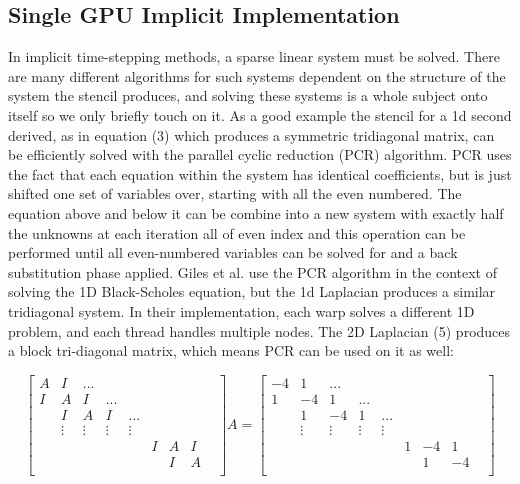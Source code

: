\documentclass[conference]{IEEEtran}
\begin{document}
\subsection{Single GPU Implicit Implementation}

In implicit time-stepping methods, a sparse linear system must be solved. There are many different algorithms for such systems dependent on the structure of the system the stencil produces, and solving these systems is a whole subject onto itself so we only briefly touch on it. As a good example the stencil for a 1d second derived, as in equation (3) which produces a symmetric tridiagonal matrix, can be efficiently solved with the parallel cyclic reduction (PCR) algorithm. PCR uses the fact that each equation within the system has identical coefficients, but is just shifted one set of variables over, starting with all the even numbered. The equation above and below it can be combine into a new system with exactly half the unknowns at each iteration all of even index and this operation can be performed until all even-numbered variables can be solved for and a back substitution phase applied. Giles et al.\cite{Giles} use the PCR algorithm in the context of solving the 1D Black-Scholes equation, but the 1d Laplacian produces a similar tridiagonal system. In their implementation, each warp solves a different 1D problem, and each thread handles multiple nodes. The 2D Laplacian (5) produces a block tri-diagonal matrix, which means PCR can be used on it as well:

$$
\begin{bmatrix}
A & I & ... & & & \\
I & A & I & ... & & & \\
  & I & A & I & ... & & & \\
  & \vdots & \vdots & \vdots & \vdots & & & \\
  &   &   &   & & I & A & I & \\
  &   &   &   & & & I & A \\
\end{bmatrix}
A = \begin{bmatrix}
  -4 & 1 & ... & & & \\
  1 & -4 & 1 & ... & & & \\
  & 1 & -4 & 1 & ... & & & \\
  & \vdots & \vdots & \vdots & \vdots & & & \\
  &   &   &   & & 1 & -4 & 1 & \\
  &   &   &   & & & 1 & -4 \\
\end{bmatrix}
$$
\end{document}
